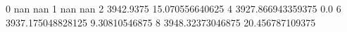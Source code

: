 0 nan nan
1 nan nan
2 3942.9375 15.070556640625
4 3927.866943359375 0.0
6 3937.175048828125 9.30810546875
8 3948.32373046875 20.456787109375
